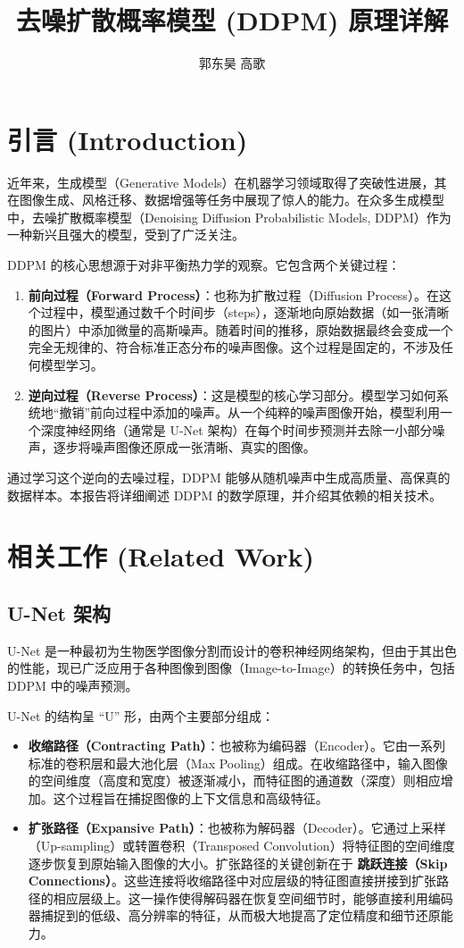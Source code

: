 \documentclass{ctexart}
\title{去噪扩散概率模型 (DDPM) 原理详解}
\author{郭东昊 \quad 高歌}
\begin{document}
\maketitle

\section{引言 (Introduction)}

\noindent
近年来，生成模型（Generative Models）在机器学习领域取得了突破性进展，其在图像生成、风格迁移、数据增强等任务中展现了惊人的能力。在众多生成模型中，去噪扩散概率模型（Denoising Diffusion Probabilistic Models, DDPM）作为一种新兴且强大的模型，受到了广泛关注。

\noindent
DDPM 的核心思想源于对非平衡热力学的观察。它包含两个关键过程：
\begin{enumerate}
    \item \textbf{前向过程（Forward Process）}：也称为扩散过程（Diffusion Process）。在这个过程中，模型通过数千个时间步（steps），逐渐地向原始数据（如一张清晰的图片）中添加微量的高斯噪声。随着时间的推移，原始数据最终会变成一个完全无规律的、符合标准正态分布的噪声图像。这个过程是固定的，不涉及任何模型学习。
    \item \textbf{逆向过程（Reverse Process）}：这是模型的核心学习部分。模型学习如何系统地“撤销”前向过程中添加的噪声。从一个纯粹的噪声图像开始，模型利用一个深度神经网络（通常是 U-Net 架构）在每个时间步预测并去除一小部分噪声，逐步将噪声图像还原成一张清晰、真实的图像。
\end{enumerate}
通过学习这个逆向的去噪过程，DDPM 能够从随机噪声中生成高质量、高保真的数据样本。本报告将详细阐述 DDPM 的数学原理，并介绍其依赖的相关技术。

\section{相关工作 (Related Work)}

\subsection{U-Net 架构}
\noindent
U-Net 是一种最初为生物医学图像分割而设计的卷积神经网络架构，但由于其出色的性能，现已广泛应用于各种图像到图像（Image-to-Image）的转换任务中，包括 DDPM 中的噪声预测。

\noindent
U-Net 的结构呈 “U” 形，由两个主要部分组成：
\begin{itemize}
    \item \textbf{收缩路径（Contracting Path）}：也被称为编码器（Encoder）。它由一系列标准的卷积层和最大池化层（Max Pooling）组成。在收缩路径中，输入图像的空间维度（高度和宽度）被逐渐减小，而特征图的通道数（深度）则相应增加。这个过程旨在捕捉图像的上下文信息和高级特征。
    \item \textbf{扩张路径（Expansive Path）}：也被称为解码器（Decoder）。它通过上采样（Up-sampling）或转置卷积（Transposed Convolution）将特征图的空间维度逐步恢复到原始输入图像的大小。扩张路径的关键创新在于 \textbf{跳跃连接（Skip Connections）}。这些连接将收缩路径中对应层级的特征图直接拼接到扩张路径的相应层级上。这一操作使得解码器在恢复空间细节时，能够直接利用编码器捕捉到的低级、高分辨率的特征，从而极大地提高了定位精度和细节还原能力。
\end{itemize}
\end{document}
